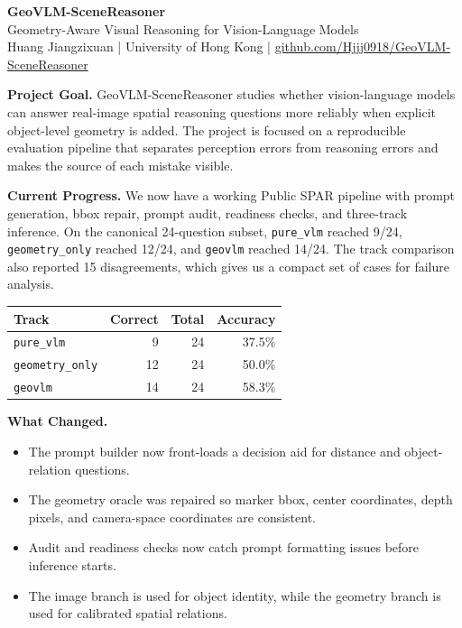 \documentclass[10pt]{article}
\newcommand{\track}[1]{\texttt{#1}}
\newcommand{\projecttitle}{GeoVLM-SceneReasoner}
\newcommand{\subtitle}{Geometry-Aware Visual Reasoning for Vision-Language Models}
\begin{document}
\begin{center}
{\Large \textbf{\projecttitle}}\\[-1pt]
{\normalsize \subtitle}\\
{\small Huang Jiangzixuan \quad | \quad University of Hong Kong \quad | \quad \href{https://github.com/Hjjj0918/GeoVLM-SceneReasoner}{github.com/Hjjj0918/GeoVLM-SceneReasoner}}
\end{center}

\vspace{-5pt}

\textbf{Project Goal.}
GeoVLM-SceneReasoner studies whether vision-language models can answer real-image spatial reasoning questions more reliably when explicit object-level geometry is added. The project is focused on a reproducible evaluation pipeline that separates perception errors from reasoning errors and makes the source of each mistake visible.

\textbf{Current Progress.}
We now have a working Public SPAR pipeline with prompt generation, bbox repair, prompt audit, readiness checks, and three-track inference. On the canonical 24-question subset, \track{pure\_vlm} reached 9/24, \track{geometry\_only} reached 12/24, and \track{geovlm} reached 14/24. The track comparison also reported 15 disagreements, which gives us a compact set of cases for failure analysis.

\vspace{-1pt}
\begin{center}
\small
\begin{tabular}{lrrr}
\toprule
\textbf{Track} & \textbf{Correct} & \textbf{Total} & \textbf{Accuracy} \\
\midrule
\track{pure\_vlm} & 9 & 24 & 37.5\% \\
\track{geometry\_only} & 12 & 24 & 50.0\% \\
\track{geovlm} & 14 & 24 & 58.3\% \\
\bottomrule
\end{tabular}
\end{center}

\textbf{What Changed.}
\begin{itemize}
  \item The prompt builder now front-loads a decision aid for distance and object-relation questions.
  \item The geometry oracle was repaired so marker bbox, center coordinates, depth pixels, and camera-space coordinates are consistent.
  \item Audit and readiness checks now catch prompt formatting issues before inference starts.
  \item The image branch is used for object identity, while the geometry branch is used for calibrated spatial relations.
\end{itemize}
\end{document}
